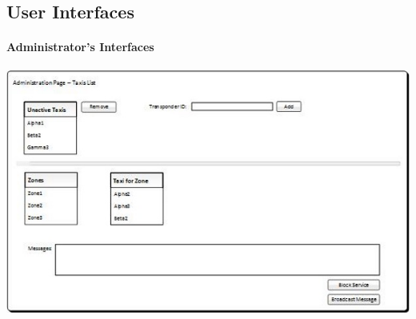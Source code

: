 \documentclass[12pt,a4paper]{book}
\begin{document}
			\subsection{User Interfaces}
				\paragraph{Administrator's Interfaces}
				\hfill\break
				\includegraphics {admin_page}
\end{document}
